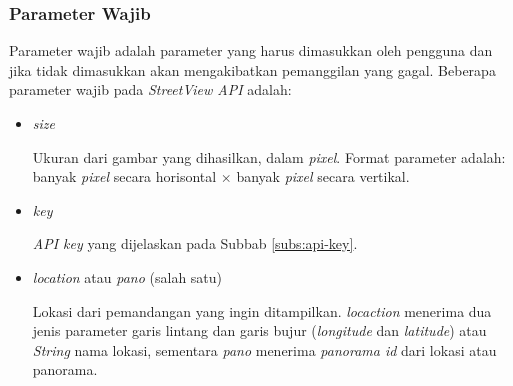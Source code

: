 \subsubsection{Parameter Wajib}
Parameter wajib adalah parameter yang harus dimasukkan oleh pengguna dan jika tidak dimasukkan akan mengakibatkan pemanggilan yang gagal. 
Beberapa parameter wajib pada {\it StreetView API} adalah:
\begin{itemize}
	\item \textit{size}
		
	Ukuran dari gambar yang dihasilkan, dalam \textit{pixel}. Format parameter adalah:
	 banyak \textit{pixel} secara horisontal $\times$ banyak \textit{pixel} secara vertikal.
	\item \textit{key}
	
	\textit{API key} yang dijelaskan pada Subbab \ref{subs:api-key}.
	\item \textit{location} atau \textit{pano} (salah satu)
	 
	 Lokasi dari pemandangan yang ingin ditampilkan. \textit{locaction} menerima dua jenis parameter garis lintang dan garis bujur (\textit{longitude} dan \textit{latitude}) atau \textit{String} nama lokasi, sementara \textit{pano} menerima \textit{panorama id} dari lokasi atau panorama. 
	 
\end{itemize}   

